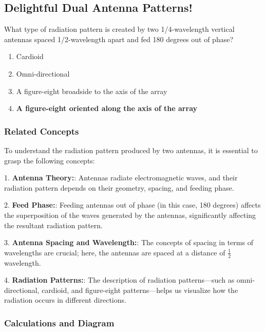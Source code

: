 \subsection{Delightful Dual Antenna Patterns!}

\begin{tcolorbox}[colback=gray!10, colframe=black, title=E9C01] 
What type of radiation pattern is created by two 1/4-wavelength vertical antennas spaced 1/2-wavelength apart and fed 180 degrees out of phase?

\begin{enumerate}[label=\Alph*.]
    \item Cardioid
    \item Omni-directional
    \item A figure-eight broadside to the axis of the array
    \item \textbf{A figure-eight oriented along the axis of the array}
\end{enumerate} \end{tcolorbox}

\subsubsection{Related Concepts}

To understand the radiation pattern produced by two antennas, it is essential to grasp the following concepts: 

1. \textbf{Antenna Theory:}: Antennas radiate electromagnetic waves, and their radiation pattern depends on their geometry, spacing, and feeding phase.

2. \textbf{Feed Phase:}: Feeding antennas out of phase (in this case, 180 degrees) affects the superposition of the waves generated by the antennas, significantly affecting the resultant radiation pattern.

3. \textbf{Antenna Spacing and Wavelength:}: The concepts of spacing in terms of wavelengths are crucial; here, the antennas are spaced at a distance of \( \frac{1}{2} \) wavelength.

4. \textbf{Radiation Patterns:}: The description of radiation patterns—such as omni-directional, cardioid, and figure-eight patterns—helps us visualize how the radiation occurs in different directions.

\subsubsection{Calculations and Diagram}

